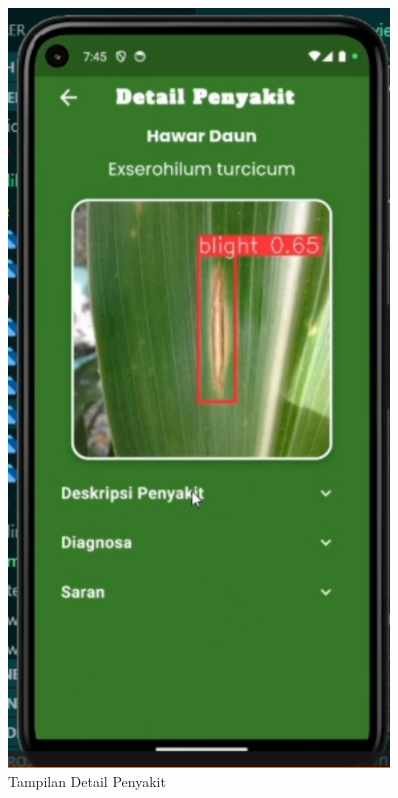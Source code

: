 \documentclass[journal,article,submit,pdftex,moreauthors]{Definitions/mdpi}
\begin{document}
\begin{itemize}
\begin{itemize}
\begin{figure}[H]
            \hfill
            \begin{minipage}{0.3\textwidth}
                \centering
                \includegraphics[width=0.9\textwidth]{Images/detail_penyakit.png}
                \caption{Tampilan Detail Penyakit}
                \label{fig:detail-disease-view}
            \end{minipage}
            \hfill
            \begin{minipage}{0.3\textwidth}
                \centering

\end{minipage}
\end{figure}
\end{itemize}
\end{itemize}
\end{document}
